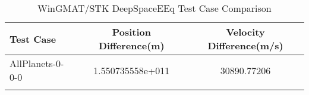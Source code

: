 \begin{table}[htbp!]
\centering
\caption{ WinGMAT/STK DeepSpaceEEq Test Case Comparison}
      \begin{tabular}{lcc}
      \hline\hline
          Test Case & Position Difference(m) & Velocity Difference(m/s) \\
         \hline
         AllPlanets-0-0-0 & 1.550735558e+011 & 30890.77206 \\
      \hline\hline
      \label{Table: DeepSpaceEEq WinGMAT-STK Table} 
\end{tabular}
\end{table}
